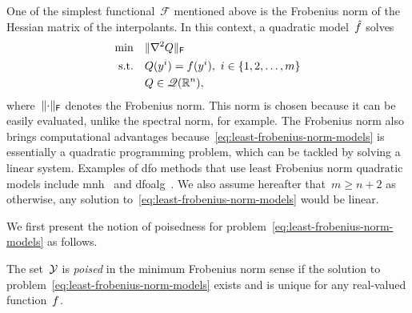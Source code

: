 One of the simplest functional~$\mathcal{F}$ mentioned above is the Frobenius norm of the Hessian matrix of the interpolants.
In this context, a quadratic model~$\objm$ solves
\begin{subequations}
    \label{eq:least-frobenius-norm-models}
    \begin{align}
        \min        & \quad \lVert\nabla^2 Q\rVert_{\mathsf{F}}\\
        \text{s.t.} & \quad Q(y^i) = f(y^i), ~ i \in \{1, 2, \dots, m\} \label{eq:least-frobenius-norm-models-eq}\\
                    & \quad Q \in \mathscr{Q}(\mathbb{R}^n), \nonumber
    \end{align}
\end{subequations}
where~$\lVert\cdot\rVert_{\mathsf{F}}$ denotes the Frobenius norm.
This norm is chosen because it can be easily evaluated, unlike the spectral norm, for example.
The Frobenius norm also brings computational advantages because~\cref{eq:least-frobenius-norm-models} is essentially a quadratic programming problem, which can be tackled by solving a linear system.
Examples of \gls{dfo} methods that use least Frobenius norm quadratic models include \gls{mnh}~\cite{Wild_2008} and \gls{dfoalg}~\cite{Conn_Scheinberg_Toint_1997a,Conn_Scheinberg_Toint_1997b,Conn_Scheinberg_Toint_1998}.
We also assume hereafter that~$m \ge n + 2$ as otherwise, any solution to~\cref{eq:least-frobenius-norm-models} would be linear.

We first present the notion of poisedness for problem~\cref{eq:least-frobenius-norm-models} as follows.

\begin{definition}[Poisedness]
    \label{def:poisedness}
    The set~$\xpt$ is \emph{poised} in the minimum Frobenius norm sense if the solution to problem~\cref{eq:least-frobenius-norm-models} exists and is unique for any real-valued function~$f$.
\end{definition}


